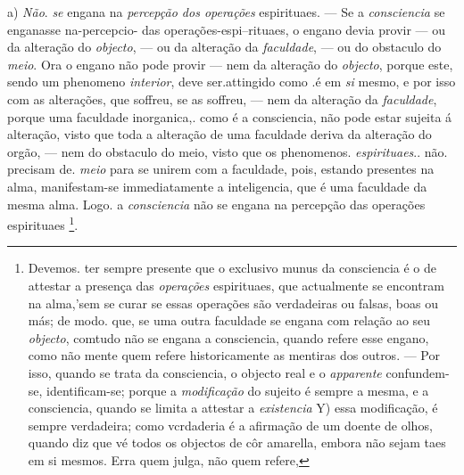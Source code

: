 a) \emph{Não}. \emph{se} engana na \emph{percepção dos operações} espirituaes. --- Se a \emph{consciencia} se enganasse na-percepcio- das operações-espi--rituaes, o engano devia provir --- ou da alteração do \emph{objecto}, --- ou da alteração da \emph{faculdade}, --- ou do obstaculo do \emph{meio}. Ora o engano não pode provir --- nem da alteração do \emph{objecto}, porque este, sendo um phenomeno \emph{interior}, deve ser.attingido como .é em \emph{si} mesmo, e por isso com as alterações, que soffreu, se as soffreu, --- nem da alteração da \emph{faculdade}, porque uma faculdade   inorganica,. como é a consciencia, não pode estar sujeita á alteração, visto que toda a alteração de uma faculdade deriva da alteração do orgão, --- nem do obstaculo do meio, visto que os phenomenos. \emph{espirituaes}.. não. precisam de. \emph{meio} para se unirem com a faculdade, pois, estando presentes na alma, manifestam-se immediatamente a inteligencia, que é uma faculdade da mesma alma. Logo. a \emph{consciencia} não se engana na percepção das operações espirituaes \footnote{Devemos. ter sempre presente que o exclusivo munus da consciencia é o de attestar a presença das \emph{operações} espirituaes, que actualmente se encontram na alma,'sem se curar se essas operações são verdadeiras ou falsas, boas ou más; de modo. que, se uma outra faculdade se engana com relação ao seu \emph{objecto}, comtudo não se engana a consciencia, quando refere esse engano, como não mente quem refere historicamente as mentiras dos outros. --- Por isso, quando se trata da consciencia, o objecto real e o \emph{apparente} confundem-se, identificam-se; porque a \emph{modificação} do sujeito é sempre a mesma, e a consciencia, quando se limita a attestar a \emph{existencia} Y) essa modificação, é sempre verdadeira; como vcrdaderia é a afirmação de um doente de olhos, quando diz que vé todos os objectos de côr amarella, embora não sejam taes em si mesmos. Erra quem julga, não quem refere,}.

